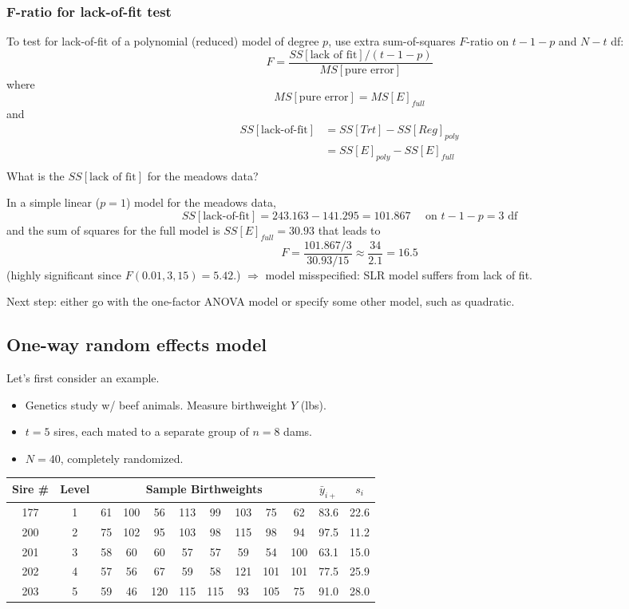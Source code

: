 \subsubsection*{F-ratio for lack-of-fit test}
To test for lack-of-fit of a polynomial (reduced) model of degree $p$, use extra sum-of-squares $F$-ratio on $t - 1 - p$ and $N - t$ df:
$$
F = \frac{SS[\mbox{lack of fit}]/(t - 1 - p)}{MS[\mbox{pure error}]}
$$
where
$$
MS[\mbox{pure error}] = MS[E]_{full}
$$
and
$$
\begin{aligned}
	SS[\mbox{lack-of-fit}] &= SS[Trt] - SS[Reg]_{poly}\\
	&= SS[E]_{poly} - SS[E]_{full}\\
\end{aligned}
$$
What is the $SS[\mbox{lack of fit}]$ for the meadows data?
\begin{pf}
	In a simple linear ($p=1$) model for the meadows data,
$$
SS[\mbox{lack-of-fit}] = 243.163 - 141.295 = 101.867 \quad \mbox{ on } t- 1 - p = 3 \mbox{ df}
$$
and the sum of squares for the full model is $SS[E]_{full} = 30.93$ that leads to
$$
F = \frac{101.867/3}{30.93/15} \approx \frac{34}{2.1} = 16.5
$$
(highly significant since $F(0.01, 3, 15) = 5.42$.)
$\Rightarrow$ model misspecified: SLR model suffers from lack of fit.
\end{pf}

Next step: either go with the one-factor ANOVA model or specify some other model, such as quadratic.


\subsection*{One-way random effects model}

Let's first consider an example.
\begin{itemize}
	\item Genetics study w/ beef animals.  Measure birthweight $Y$ (lbs).
	\item $t = 5$ sires, each mated to a separate group of $n = 8$ dams.
	\item $N=40$, completely randomized.
\end{itemize}
\begin{table}[H]
	\renewcommand{\arraystretch}{1.5}
	\centering
	\begin{tabular}{cc|cccccccc|c|c}
		\toprule
		Sire \# & Level & \multicolumn{8}{c}{Sample Birthweights} & $\bar{y}_{i+}$ & $s_i$\\
		\hline
		177 & 1 & 61 & 100 &56 & 113 & 99 & 103 & 75 & 62 & 83.6 & 22.6\\
		200 & 2 & 75 & 102 &95 & 103 & 98 & 115 & 98 & 94 & 97.5 & 11.2\\
		201 & 3 & 58 & 60 &60 & 57 & 57 & 59 & 54 & 100 & 63.1 & 15.0\\
		202 & 4 & 57 & 56 &67 & 59 & 58 & 121 & 101 & 101 & 77.5 & 25.9\\
		203 & 5 & 59 & 46 &120 & 115 & 115 & 93 & 105 & 75 & 91.0 & 28.0\\								
		\bottomrule
	\end{tabular}
\end{table}

